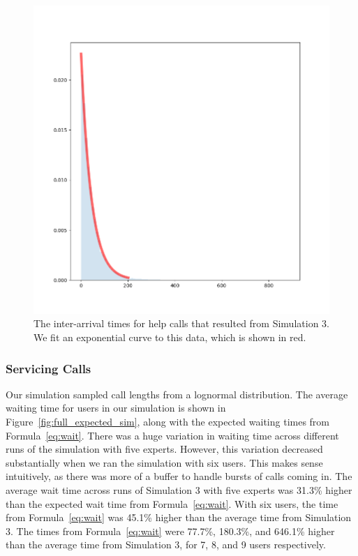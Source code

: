 \begin{figure}[H]
  \includegraphics[width=\textwidth]{figures/montecarlo/call_times.png}
  \caption{
    The inter-arrival times for help calls that resulted from Simulation 3.
    We fit an exponential curve to this data, which is shown in red.
  }\label{fig:step_patience}
\end{figure}

\subsubsection{Servicing Calls}

Our simulation sampled call lengths from a lognormal distribution.
The average waiting time for users in our simulation is shown in
Figure~\ref{fig:full_expected_sim}, along with the expected waiting times from
Formula~\ref{eq:wait}.
There was a huge variation in waiting time across different runs of the
simulation with five experts.
However, this variation decreased substantially when we ran the simulation with
six users.
This makes sense intuitively, as there was more of a buffer to handle bursts of
calls coming in.
The average wait time across runs of Simulation 3 with five experts was 31.3\%
higher than the expected wait time from Formula~\ref{eq:wait}.
With six users, the time from Formula~\ref{eq:wait} was 45.1\% higher than the
average time from Simulation 3.
The times from Formula~\ref{eq:wait} were 77.7\%, 180.3\%, and 646.1\% higher
than the average time from Simulation 3, for 7, 8, and 9 users
respectively.

